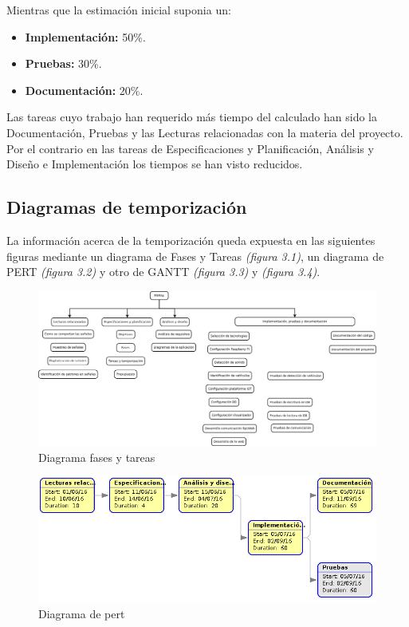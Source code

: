 Mientras que la estimación inicial suponia un:

\begin{itemize}
  \item \textbf{Implementación: }50\%.
  \item \textbf{Pruebas: }30\%.
  \item \textbf{Documentación: }20\%.
\end{itemize}

Las tareas cuyo trabajo han requerido más tiempo del calculado han sido la Documentación, Pruebas y las Lecturas relacionadas con la materia del proyecto. Por el contrario en las tareas de Especificaciones y Planificación, Análisis y Diseño e Implementación los tiempos se han visto reducidos.

\subsection{Diagramas de temporización}

La información acerca de la temporización queda expuesta en las siguientes figuras mediante un diagrama de Fases y Tareas \textit{(figura 3.1)}, un diagrama de PERT \textit{(figura 3.2)} y otro de GANTT \textit{(figura 3.3)} y \textit{(figura 3.4)}.

\begin{figure}[!ht]
  \begin{center}
    \includegraphics[scale=0.30]{../images/diag_plan/fases_tareas.png}
    \caption{Diagrama fases y tareas}
    \label{fig:fases_tareas}
  \end{center}
\end{figure}

\newpage
\begin{figure}[!ht]
  \begin{center}
    \includegraphics[width=1\textwidth]{../images/diag_plan/pert.png}
    \caption{Diagrama de pert}
    \label{fig:pert}
  \end{center}
\end{figure}

